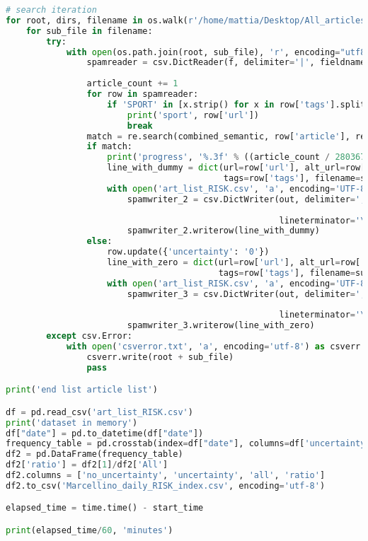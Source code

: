 \documentclass[12pt]{article}
\begin{document}
\begin{lstlisting}[language=Python]
# search iteration
for root, dirs, filename in os.walk(r'/home/mattia/Desktop/All_articles'):
    for sub_file in filename:
        try:
            with open(os.path.join(root, sub_file), 'r', encoding="utf8", errors='ignore') as f:
                spamreader = csv.DictReader(f, delimiter='|', fieldnames=['date', 'longdate', 'url', 'alt_url', 'header',
                                                                          'article', 'tags'])
                article_count += 1
                for row in spamreader:
                    if 'SPORT' in [x.strip() for x in row['tags'].split(',')]:
                        print('sport', row['url'])
                        break
                match = re.search(combined_semantic, row['article'], re.IGNORECASE)
                if match:
                    print('progress', '%.3f' % ((article_count / 2803677) * 100), '%')
                    line_with_dummy = dict(url=row['url'], alt_url=row['alt_url'], date=row['date'],
                                           tags=row['tags'], filename=sub_file, uncertainty='1')
                    with open('art_list_RISK.csv', 'a', encoding='UTF-8') as out:
                        spamwriter_2 = csv.DictWriter(out, delimiter=',', fieldnames=['date', 'url', 'alt_url', 'tags',
                                                                                      'filename', 'uncertainty'],
                                                      lineterminator='\n')
                        spamwriter_2.writerow(line_with_dummy)
                else:
                    row.update({'uncertainty': '0'})
                    line_with_zero = dict(url=row['url'], alt_url=row['alt_url'], date=row['date'],
                                          tags=row['tags'], filename=sub_file, uncertainty='0')
                    with open('art_list_RISK.csv', 'a', encoding='UTF-8') as out:
                        spamwriter_3 = csv.DictWriter(out, delimiter=',', fieldnames=['date', 'url', 'alt_url', 'tags',
                                                                                      'filename', 'uncertainty'],
                                                      lineterminator='\n')
                        spamwriter_3.writerow(line_with_zero)
        except csv.Error:
            with open('csverror.txt', 'a', encoding='utf-8') as csverr:
                csverr.write(root + sub_file)
                pass

print('end list article list')

df = pd.read_csv('art_list_RISK.csv')
print('dataset in memory')
df["date"] = pd.to_datetime(df["date"])
frequency_table = pd.crosstab(index=df["date"], columns=df['uncertainty'], margins=True)
df2 = pd.DataFrame(frequency_table)
df2['ratio'] = df2[1]/df2['All']
df2.columns = ['no_uncertainty', 'uncertainty', 'all', 'ratio']
df2.to_csv('Marcellino_daily_RISK_index.csv', encoding='utf-8')

elapsed_time = time.time() - start_time

print(elapsed_time/60, 'minutes')
\end{lstlisting}
\end{document}
